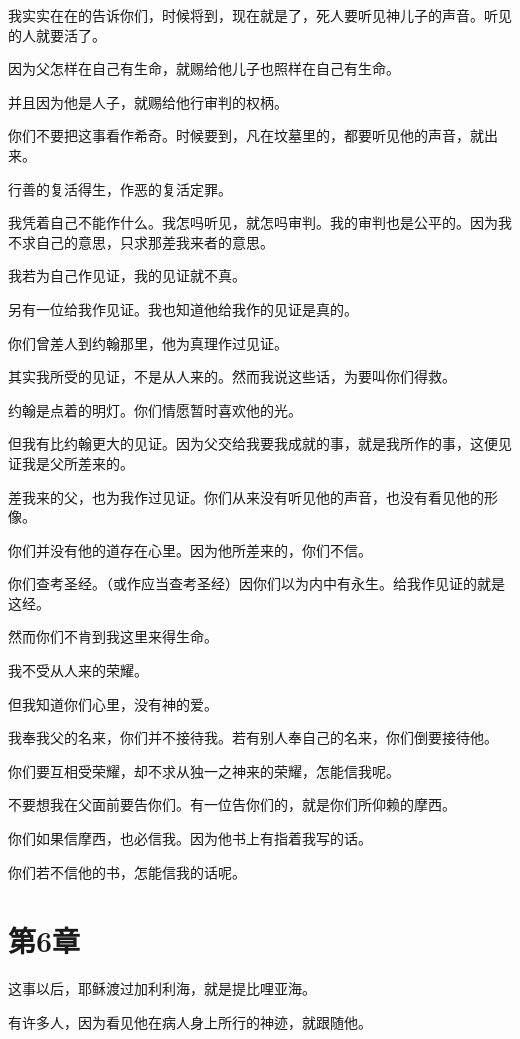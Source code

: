\documentclass[12pt,oneside]{book}
\begin{document}
我实实在在的告诉你们，时候将到，现在就是了，死人要听见神儿子的声音。听见的人就要活了。

因为父怎样在自己有生命，就赐给他儿子也照样在自己有生命。

并且因为他是人子，就赐给他行审判的权柄。

你们不要把这事看作希奇。时候要到，凡在坟墓里的，都要听见他的声音，就出来。

行善的复活得生，作恶的复活定罪。

我凭着自己不能作什么。我怎吗听见，就怎吗审判。我的审判也是公平的。因为我不求自己的意思，只求那差我来者的意思。

我若为自己作见证，我的见证就不真。

另有一位给我作见证。我也知道他给我作的见证是真的。

你们曾差人到约翰那里，他为真理作过见证。

其实我所受的见证，不是从人来的。然而我说这些话，为要叫你们得救。

约翰是点着的明灯。你们情愿暂时喜欢他的光。

但我有比约翰更大的见证。因为父交给我要我成就的事，就是我所作的事，这便见证我是父所差来的。

差我来的父，也为我作过见证。你们从来没有听见他的声音，也没有看见他的形像。

你们并没有他的道存在心里。因为他所差来的，你们不信。

你们查考圣经。（或作应当查考圣经）因你们以为内中有永生。给我作见证的就是这经。

然而你们不肯到我这里来得生命。

我不受从人来的荣耀。

但我知道你们心里，没有神的爱。

我奉我父的名来，你们并不接待我。若有别人奉自己的名来，你们倒要接待他。

你们要互相受荣耀，却不求从独一之神来的荣耀，怎能信我呢。

不要想我在父面前要告你们。有一位告你们的，就是你们所仰赖的摩西。

你们如果信摩西，也必信我。因为他书上有指着我写的话。

你们若不信他的书，怎能信我的话呢。

\chapter{第6章}
这事以后，耶稣渡过加利利海，就是提比哩亚海。

有许多人，因为看见他在病人身上所行的神迹，就跟随他。
\end{document}

